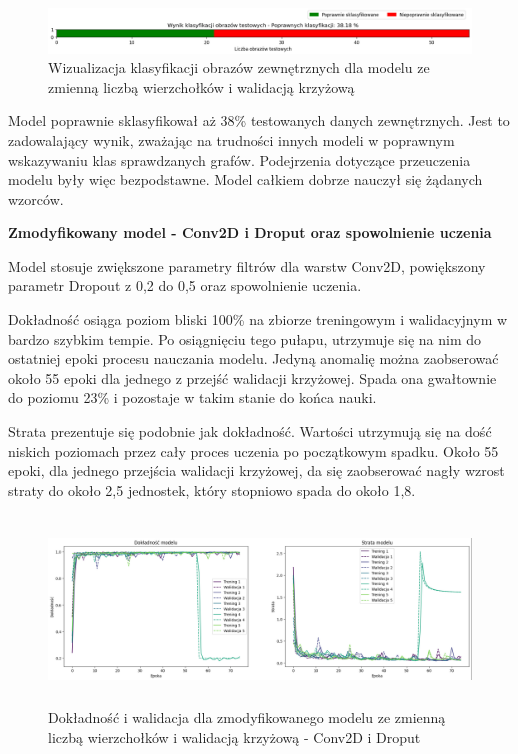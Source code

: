 \begin{figure}[ht]
	\centering
	\includegraphics[width=14cm]{resources/tests/images/v3/multiple_edges_crossvalid_bar.png}
	\caption{Wizualizacja klasyfikacji obrazów zewnętrznych dla modelu ze zmienną liczbą wierzchołków i walidacją krzyżową}
	\label{Fig:tests-csvar-0c}
\end{figure}
\FloatBarrier

Model poprawnie sklasyfikował aż 38\% testowanych danych zewnętrznych.
Jest to zadowalający wynik, zważając na trudności innych modeli w poprawnym wskazywaniu klas sprawdzanych grafów.
Podejrzenia dotyczące przeuczenia modelu były więc bezpodstawne.
Model całkiem dobrze nauczył się żądanych wzorców.

\textbf{Zmodyfikowany model - Conv2D i Droput oraz spowolnienie uczenia}

Model stosuje zwiększone parametry filtrów dla warstw Conv2D, powiększony parametr Dropout z 0,2 do 0,5
oraz spowolnienie uczenia.

Dokładność osiąga poziom bliski 100\% na zbiorze treningowym i walidacyjnym w bardzo szybkim tempie.
Po osiągnięciu tego pułapu, utrzymuje się na nim do ostatniej epoki procesu nauczania modelu.
Jedyną anomalię można zaobserować około 55 epoki dla jednego z przejść walidacji krzyżowej.
Spada ona gwałtownie do poziomu 23\% i pozostaje w takim stanie do końca nauki.

Strata prezentuje się podobnie jak dokładność.
Wartości utrzymują się na dość niskich poziomach przez cały proces uczenia po początkowym spadku.
Około 55 epoki, dla jednego przejścia walidacji krzyżowej,
da się zaobserować nagły wzrost straty do około 2,5 jednostek, który stopniowo spada do około 1,8.

\begin{figure}[ht]
	\centering
	\includegraphics[height=5cm]{resources/tests/images/v4/multiple_edges_crossvalid_1_img.png}
	\caption{Dokładność i walidacja dla zmodyfikowanego modelu ze zmienną liczbą wierzchołków i walidacją krzyżową - Conv2D i Droput}
	\label{Fig:tests-csvar-1a}
\end{figure}
\FloatBarrier

